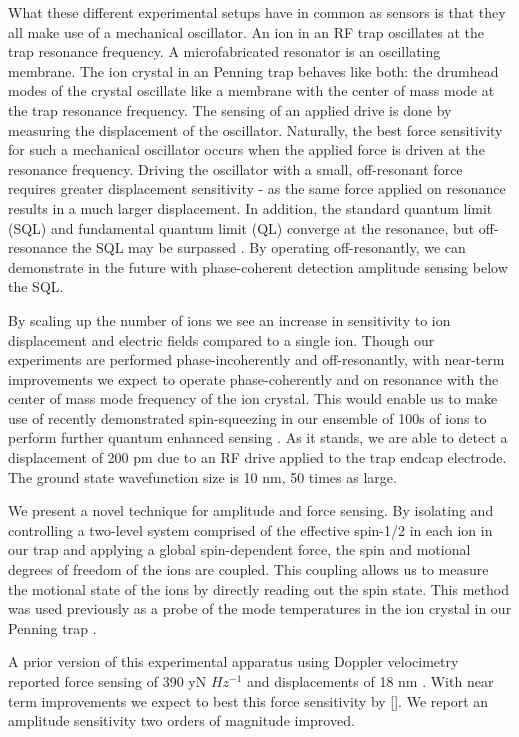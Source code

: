 \documentclass[aps,prl,twocolumn,superscriptaddress,floatfix]{revtex4-1}
\begin{document}
What these different experimental setups have in common as sensors is that they all make use of a mechanical oscillator. An ion in an RF trap oscillates at the trap resonance frequency. A microfabricated resonator is an oscillating membrane. The ion crystal in an Penning trap behaves like both: the drumhead modes of the crystal oscillate like a membrane with the center of mass mode at the trap resonance frequency. The sensing of an applied drive is done by measuring the displacement of the oscillator. Naturally, the best force sensitivity for such a mechanical oscillator occurs when the applied force is driven at the resonance frequency. Driving the oscillator with a small, off-resonant force requires greater displacement sensitivity - as the same force applied on resonance results in a much larger displacement. In addition, the standard quantum limit (SQL) and fundamental quantum limit (QL) converge at the resonance, but off-resonance the SQL may be surpassed \citep{Ivanov2016,Kampel2016,Schreppler2014a}. By operating off-resonantly, we can demonstrate in the future with phase-coherent detection amplitude sensing below the SQL.

By scaling up the number of ions we see an increase in sensitivity to ion displacement and electric fields compared to a single ion. Though our experiments are performed phase-incoherently and off-resonantly, with near-term improvements we expect to operate phase-coherently and on resonance with the center of mass mode frequency of the ion crystal. This would enable us to make use of recently demonstrated spin-squeezing in our ensemble of 100s of ions to perform further quantum enhanced sensing \citep{Bohnet2015a}. As it stands, we are able to detect a displacement of 200 pm due to an RF drive applied to the trap endcap electrode. The ground state wavefunction size is 10 nm, 50 times as large.

We present a novel technique for amplitude and force sensing. By isolating and controlling a two-level system comprised of the effective spin-1/2 in each ion in our trap and applying a global spin-dependent force, the spin and motional degrees of freedom of the ions are coupled. This coupling allows us to measure the motional state of the ions by directly reading out the spin state. This method was used previously as a probe of the mode temperatures in the ion crystal in our Penning trap \citep{Sawyer2014a}.

A prior version of this experimental apparatus using Doppler velocimetry reported force sensing of 390 yN $Hz^{-1}$ and displacements of 18 nm \citep{Biercuk2010a, Biercuk2011}. With near term improvements we expect to best this force sensitivity by []. We report an amplitude sensitivity two orders of magnitude improved.
\end{document}
